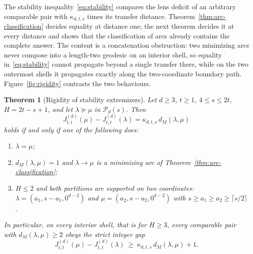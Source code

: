 \documentclass[pdflatex,sn-mathphys-num]{sn-jnl}
\theoremstyle{thmstyleone}
\newtheorem{theorem}{Theorem}[section]
\theoremstyle{thmstylethree}
\theoremstyle{thmstyletwo}
\begin{document}
The stability inequality~\eqref{eq:stability} compares the lens deficit of
an arbitrary comparable pair with $\kappa_{d,t,s}$ times its transfer
distance.  Theorem~\ref{thm:arc-classification} decides equality at
distance one; the next theorem decides it at every distance and shows that
the classification of arcs already contains the complete answer.  The
content is a concatenation obstruction: two minimizing arcs never compose
into a length-two geodesic on an interior shell, so equality
in~\eqref{eq:stability} cannot propagate beyond a single transfer there,
while on the two outermost shells it propagates exactly along the
two-coordinate boundary path.  Figure~\ref{fig:rigidity} contrasts the two
behaviours.

\begin{theorem}[Rigidity of stability extremizers]
\label{thm:pair-rigidity}
Let $d\ge3$, $t\ge1$, $4\le s\le2t$, $H=2t-s+1$, and let
$\lambda\succeq\mu$ in $\mathcal P_d(s)$.  Then
\begin{equation}
 J_{t,t}^{(d)}(\mu)-J_{t,t}^{(d)}(\lambda)
 =\kappa_{d,t,s}\,d_M(\lambda,\mu)                  \label{eq:pair-equality}
\end{equation}
holds if and only if one of the following does:
\begin{enumerate}
\item[\textup{(i)}] $\lambda=\mu$;
\item[\textup{(ii)}] $d_M(\lambda,\mu)=1$ and $\lambda\to\mu$ is a
minimizing arc of Theorem~\ref{thm:arc-classification};
\item[\textup{(iii)}] $H\le2$ and both partitions are supported on two
coordinates: $\lambda=(a_1,s-a_1,0^{d-2})$ and
$\mu=(a_2,s-a_2,0^{d-2})$ with $s\ge a_1\ge a_2\ge\lceil s/2\rceil$.
\end{enumerate}
In particular, on every interior shell, that is for $H\ge3$, every
comparable pair with $d_M(\lambda,\mu)\ge2$ obeys the strict integer gap
\begin{equation}
 J_{t,t}^{(d)}(\mu)-J_{t,t}^{(d)}(\lambda)
 \ \ge\ \kappa_{d,t,s}\,d_M(\lambda,\mu)+1.        \label{eq:rigidity-gap}
\end{equation}
\end{theorem}
\end{document}

